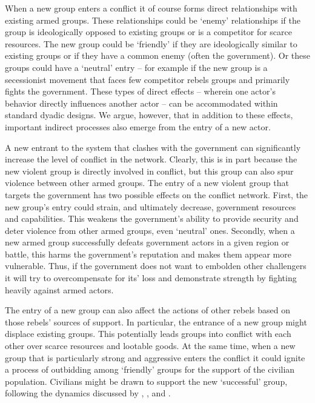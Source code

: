 When a new group enters a conflict it of course forms direct relationships with existing armed groups. These relationships could be `enemy' relationships if the group is ideologically opposed to existing groups or is a competitor for scarce resources. The new group could be `friendly' if they are ideologically similar to existing groups or if they have a common enemy (often the government). Or these groups could have a `neutral' entry -- for example if the new group is a secessionist movement that faces few competitor rebels groups and primarily fights the government. These types of direct effects -- wherein one actor's behavior directly influences another actor -- can be accommodated within standard dyadic designs. We argue, however, that in addition to these effects, important indirect processes also emerge from the entry of a new actor.

A new entrant to the system that clashes with the government can significantly increase the level of conflict in the network. Clearly, this is in part because the new violent group is directly involved in conflict, but this group can also spur violence between other armed groups. The entry of a new violent group that targets the government has two possible effects on the conflict network. First, the new group's entry could strain, and ultimately decrease,  government resources and capabilities. This weakens the government's ability to provide security and deter violence from other armed groups, even `neutral' ones. Secondly, when a new armed group successfully defeats government actors in a given region or battle, this harms the government's reputation and makes them appear more vulnerable. Thus, if the government does not want to embolden other challengers \citep{walter:2006} it will try to overcompensate for its' loss and demonstrate strength by fighting heavily against armed actors. 

The entry of a new group can also affect the actions of other rebels based on those rebels' sources of support. In particular, the entrance of a new group might displace existing groups. This potentially leads groups into conflict with each other over scarce resources and lootable goods. At the same time, when a new group that is particularly strong and aggressive enters the conflict it could ignite a process of outbidding among `friendly' groups for the support of the civilian population. Civilians might be drawn to support the new `successful' group, following the dynamics discussed by \citet{bloom:2004}, \citet{nemeth:2014}, and \citet{toft:2003}.

